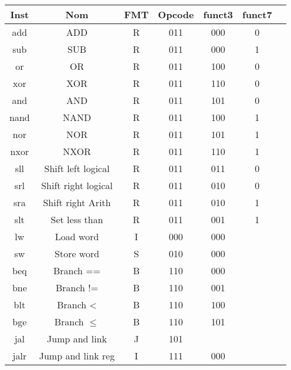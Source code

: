 \documentclass[a4paper]{article}
\begin{document}
    \begin{tabular}{|c|c|c|c|c|c|c|}
        \hline
        Inst & Nom                  & FMT & Opcode & funct3 & funct7 \\
        \hline
        add  & ADD                  & R   & 011    & 000    & 0      \\
        sub  & SUB                  & R   & 011    & 000    & 1      \\
        or   & OR                   & R   & 011    & 100    & 0      \\
        xor  & XOR                  & R   & 011    & 110    & 0      \\
        and  & AND                  & R   & 011    & 101    & 0      \\
        nand & NAND                 & R   & 011    & 100    & 1      \\
        nor  & NOR                  & R   & 011    & 101    & 1      \\
        nxor & NXOR                 & R   & 011    & 110    & 1      \\
        sll  & Shift left logical   & R   & 011    & 011    & 0      \\
        srl  & Shift right logical  & R   & 011    & 010    & 0      \\
        sra  & Shift right Arith    & R   & 011    & 010    & 1      \\
        slt  & Set less than        & R   & 011    & 001    & 1      \\
        \hline
        lw   & Load word            & I   & 000    & 000    &        \\
        sw   & Store word           & S   & 010    & 000    &        \\
        \hline
        beq  & Branch ==            & B   & 110    & 000    &        \\
        bne  & Branch !=            & B   & 110    & 001    &        \\
        blt  & Branch <             & B   & 110    & 100    &        \\
        bge  & Branch \(\leqslant\) & B   & 110    & 101    &        \\
        \hline
        jal  & Jump and link        & J   & 101    &        &        \\
        jalr & Jump and link reg    & I   & 111    & 000    &        \\
        \hline
    \end{tabular}
\end{document}
